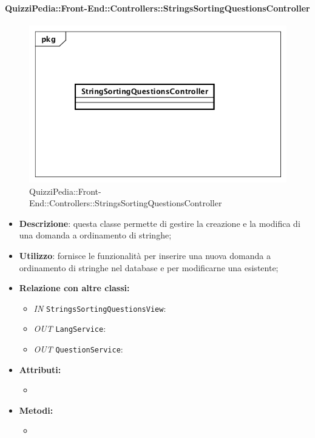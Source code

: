 \paragraph{QuizziPedia::Front-End::Controllers::StringsSortingQuestionsController}
\begin{figure}
	\centering
	\includegraphics[scale=0.45]{UML/Classi/Front-End/QuizziPedia_Front-end_Controller_StringSortingQuestionsController.png}
	\caption{QuizziPedia::Front-End::Controllers::StringsSortingQuestionsController}
\end{figure}
\begin{itemize}
	\item \textbf{Descrizione}: questa classe permette di gestire la creazione e la modifica di una domanda a ordinamento di stringhe;
	\item \textbf{Utilizzo}: fornisce le funzionalità per inserire una nuova domanda a ordinamento di stringhe nel database e per modificarne una esistente;
	\item \textbf{Relazione con altre classi:}
	\begin{itemize}
		\item \textit{IN} \texttt{StringsSortingQuestionsView}:  
		\item \textit{OUT} \texttt{LangService}: 
		\item \textit{OUT} \texttt{QuestionService}:
	\end{itemize}
	\item \textbf{Attributi:}
	\begin{itemize}
		\item 
	\end{itemize}
	\item \textbf{Metodi:}
	\begin{itemize}
		\item 
	\end{itemize}
\end{itemize}

